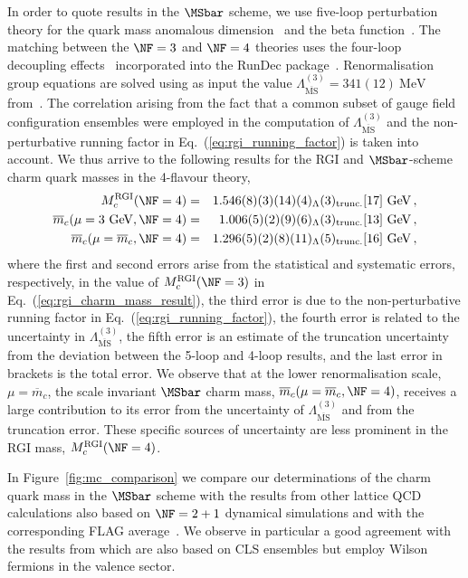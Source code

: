 In order to quote results in the $\MSbar$ scheme, we use five-loop perturbation theory for the quark
mass anomalous dimension~\cite{Baikov:2014qja,Luthe:2016xec,Baikov:2017ujl} and the beta function~\cite{Baikov:2016tgj,Herzog:2017ohr,Luthe:2017ttc}.
The matching between the $\NF=3$ and $\NF=4$ theories uses the four-loop decoupling effects~\cite{Liu:2015fxa}
incorporated into the RunDec package~\cite{Chetyrkin:2000yt,Schmidt:2012az,Herren:2017osy}. Renormalisation group equations are solved using as input the value 
$\Lambda^{(3)}_{\overline{\mathrm{MS}}} = 341(12)\ \mathrm{MeV}$ from~\cite{Bruno:2017gxd}. The correlation arising from the fact that a common subset of gauge field configuration ensembles were employed in the computation of $\Lambda^{(3)}_{\overline{\mathrm{MS}}}$ and the non-perturbative running factor in Eq.~(\ref{eq:rgi_running_factor}) is taken into account. We thus arrive to the following results for the RGI and $\MSbar$-scheme charm quark masses in the 4-flavour theory,
\begin{eqnarray}
  M_c^{\mathrm{RGI}}(\NF=4) &=& 1.546(8)(3)(14)(4)_\Lambda(3)_{\rm trunc.}[17] \ \mathrm{GeV}\,,\\
  \overline{m}_c(\mu=3\ \mathrm{GeV}, \NF=4) &=& 1.006(5)(2)(9)(6)_\Lambda(3)_{\rm trunc.}[13] \ \mathrm{GeV}\,,
	\\
	\overline{m}_c(\mu=\overline{m}_c, \NF=4) &=& 1.296(5)(2)(8)(11)_\Lambda(5)_{\rm trunc.}[16] \ \mathrm{GeV}\,,
\end{eqnarray}
where the first and second errors arise from the statistical and systematic errors, respectively, in the value of $M_c^{\mathrm{RGI}}(\NF=3)$ in Eq.~(\ref{eq:rgi_charm_mass_result}), the third error is due to the non-perturbative running factor in Eq.~(\ref{eq:rgi_running_factor}), the fourth error is related to the uncertainty in $\Lambda^{(3)}_{\overline{\mathrm{MS}}}$, the fifth error is an estimate of the truncation uncertainty from the deviation between the 5-loop and 4-loop results, and the last error in brackets is the total error. We observe that at the lower renormalisation scale, $\mu=\overline{m}_c$, the scale invariant $\MSbar$ charm mass, $\overline{m}_c(\mu=\overline{m}_c, \NF=4)$, receives a large contribution to its error from the uncertainty of $\Lambda^{(3)}_{\overline{\mathrm{MS}}}$ and from the truncation error. These specific sources of uncertainty are less prominent in the RGI mass, $M_c^{\mathrm{RGI}}(\NF=4)$.

In Figure~\ref{fig:mc_comparison} we compare our determinations of the charm quark mass in the $\MSbar$ scheme with the results from other lattice QCD calculations also based on $\NF=2+1$ dynamical simulations and with the corresponding FLAG average~\cite{FlavourLatticeAveragingGroupFLAG:2021npn}. We observe in particular a good agreement with the results from \cite{Heitger:2021apz} which are also based on CLS ensembles but employ Wilson fermions in the valence sector.

